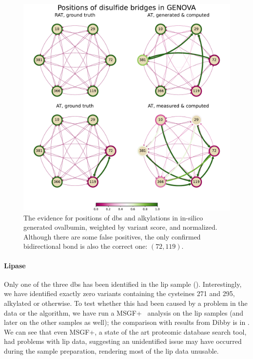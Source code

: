 \begin{figure}
  \centering
  \includegraphics[width=0.9\linewidth]{img/genova.pdf}
  \caption{The evidence for positions of \glspl*{db} and alkylations in in-silico generated ovalbumin, weighted by variant score, and normalized. Although there are some false positives, the only confirmed bidirectional bond is also the correct one: \((72, 119)\).}\label{fig:genova}
\end{figure}

\paragraph{Lipase} Only one of the three \glspl*{db} has been identified in the \gls*{lip} sample (). Interestingly, we have identified exactly zero variants containing the cysteines 271 and 295, alkylated or otherwise. To test whether this had been caused by a problem in the data or the algorithm, we have run a MSGF+~\cite{kim2014ms} analysis on the \gls*{lip} samples (and later on the other samples as well); the comparison with results from Dibby is in . We can see that even MSGF+, a state of the art proteomic database search tool, had problems with \gls*{lip} data, suggesting an unidentified issue may have occurred during the sample preparation, rendering most of the \gls*{lip} data unusable.

